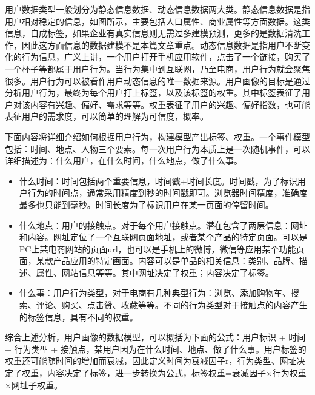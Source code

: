 		用户数据类型一般划分为静态信息数据、动态信息数据两大类。静态信息数据是指用户相对稳定的信息，如图所示，主要包括人口属性、商业属性等方面数据。这类信息，自成标签，如果企业有真实信息则无需过多建模预测，更多的是数据清洗工作，因此这方面信息的数据建模不是本篇文章重点。动态信息数据是指用户不断变化的行为信息，广义上讲，一个用户打开手机应用软件，点击了一个链接，购买了一个杯子等都属于用户行为。当行为集中到互联网，乃至电商，用户行为就会聚焦很多。用户行为可以被看作用户动态信息的唯一数据来源。用户画像的目标是通过分析用户行为，最终为每个用户打上标签，以及该标签的权重。其中标签表征了用户对该内容有兴趣、偏好、需求等等。权重表征了用户的兴趣、偏好指数，也可能表征用户的需求度，可以简单的理解为可信度，概率。

		下面内容将详细介绍如何根据用户行为，构建模型产出标签、权重。一个事件模型包括：时间、地点、人物三个要素。每一次用户行为本质上是一次随机事件，可以详细描述为：什么用户，在什么时间，什么地点，做了什么事。
		\begin{itemize}
			\item 什么时间：时间包括两个重要信息，时间戳+时间长度。时间戳，为了标识用户行为的时间点，通常采用精度到秒的时间戳即可。浏览器时间精度，准确度最多也只能到毫秒。时间长度为了标识用户在某一页面的停留时间。
			\item 什么地点：用户的接触点。对于每个用户接触点。潜在包含了两层信息：网址和内容。网址定位了一个互联网页面地址，或者某个产品的特定页面。可以是PC上某电商网站的页面url，也可以是手机上的微博，微信等应用某个功能页面，某款产品应用的特定画面。内容可以是单品的相关信息：类别、品牌、描述、属性、网站信息等等。其中网址决定了权重；内容决定了标签。
			\item 什么事：用户行为类型，对于电商有几种典型行为：浏览、添加购物车、搜索、评论、购买、点击赞、收藏等等。不同的行为类型对于接触点的内容产生的标签信息，具有不同的权重。
		\end{itemize}

		综合上述分析，用户画像的数据模型，可以概括为下面的公式：用户标识 + 时间 + 行为类型 + 接触点，某用户因为在什么时间、地点、做了什么事。用户标签的权重还可能随时间的增加而衰减，因此定义时间为衰减因子r，行为类型、网址决定了权重，内容决定了标签，进一步转换为公式，标签权重=衰减因子×行为权重×网址子权重。

